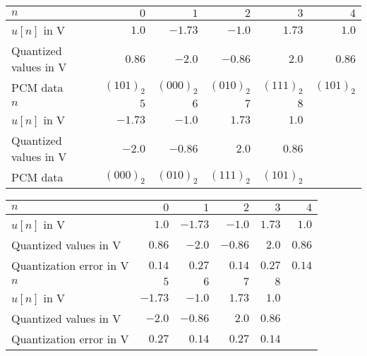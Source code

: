 \begin{solution}
\begin{tasks}
		\task
		\begin{table}[H]
			\centering
			\begin{tabular}{|l|r|r|r|r|r|}
				\hline
				$n$ & $0$ & $1$ & $2$ & $3$ & $4$
\\
				\hline
				\hline
				$u[n]$ in \si{V} & $1.0$ & $-1.73$ & $-1.0$ & $1.73$ & $1.0$ \\
				\hline
				Quantized values in \si{V} & $0.86$ & $-2.0$ & $-0.86$ & $2.0$ & $0.86$ \\
				\hline
				PCM data & $\left(101\right)_2$ & $\left(000\right)_2$ & $\left(010\right)_2$ & $\left(111\right)_2$ & $\left(101\right)_2$ \\
				\hline
				\hline
				$n$ & $5$ & $6$ & $7$ & $8$ &
\\
				\hline
				\hline
				$u[n]$ in \si{V} & $-1.73$ & $-1.0$ & $1.73$ & $1.0$ & \\
				\hline
				Quantized values in \si{V} & $-2.0$ & $-0.86$ & $2.0$ & $0.86$ & \\
				\hline
				PCM data & $\left(000\right)_2$ & $\left(010\right)_2$ & $\left(111\right)_2$ & $\left(101\right)_2$ & \\
				\hline
			\end{tabular}
		\end{table}
	
		\task
		\begin{table}[H]
			\centering
			\begin{tabular}{|l|r|r|r|r|r|}
				\hline
				$n$ & $0$ & $1$ & $2$ & $3$ & $4$
\\
				\hline
				\hline
				$u[n]$ in \si{V} & $1.0$ & $-1.73$ & $-1.0$ & $1.73$ & $1.0$ \\
				\hline
				Quantized values in \si{V} & $0.86$ & $-2.0$ & $-0.86$ & $2.0$ & $0.86$ \\
				\hline
				Quantization error in \si{V} & $0.14$ & $0.27$ & $0.14$ & $0.27$ & $0.14$ \\
				\hline
				\hline
				$n$ & $5$ & $6$ & $7$ & $8$ &
\\
				\hline
				\hline
				$u[n]$ in \si{V} & $-1.73$ & $-1.0$ & $1.73$ & $1.0$ & \\
				\hline
				Quantized values in \si{V} & $-2.0$ & $-0.86$ & $2.0$ & $0.86$ & \\
				\hline
				Quantization error in \si{V} & $0.27$ & $0.14$ & $0.27$ & $0.14$ & \\
				\hline
			\end{tabular}
		\end{table}
	

\end{tasks}
\end{solution}
